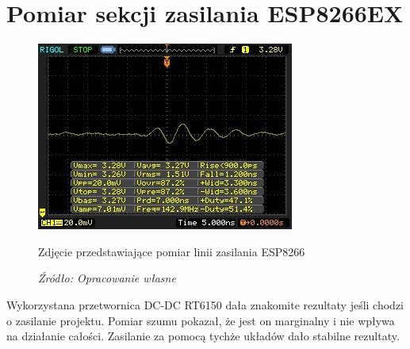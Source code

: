 \documentclass[12pt,a4paper,oneside]{memoir}
\begin{document}
\section{Pomiar sekcji zasilania ESP8266EX}
\begin{figure} [!h]
	\centering
	\includegraphics[scale=1]{images/photos/5.jpg}
	{\tytulyrozdzialow \footnotesize \caption[Pomiar - zasilanie ESP8266] {Zdjęcie przedstawiające pomiar linii zasilania ESP8266}}
	\caption*{\textit{Źródło: Opracowanie własne}}
\end{figure}
\par Wykorzystana przetwornica DC-DC RT6150 dała znakomite rezultaty jeśli chodzi o zasilanie projektu. Pomiar szumu pokazał, że jest on marginalny i nie wpływa na działanie całości. Zasilanie za pomocą tychże układów dało stabilne rezultaty.
\end{document}
